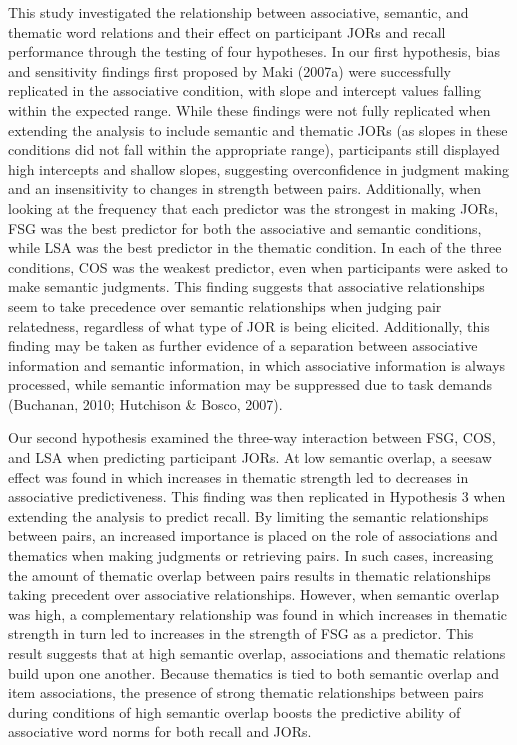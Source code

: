 \documentclass[english,man]{apa6}
\theoremstyle{definition}
\theoremstyle{definition}
\theoremstyle{definition}
\theoremstyle{remark}
\begin{document}
This study investigated the relationship between associative, semantic,
and thematic word relations and their effect on participant JORs and
recall performance through the testing of four hypotheses. In our first
hypothesis, bias and sensitivity findings first proposed by Maki (2007a)
were successfully replicated in the associative condition, with slope
and intercept values falling within the expected range. While these
findings were not fully replicated when extending the analysis to
include semantic and thematic JORs (as slopes in these conditions did
not fall within the appropriate range), participants still displayed
high intercepts and shallow slopes, suggesting overconfidence in
judgment making and an insensitivity to changes in strength between
pairs. Additionally, when looking at the frequency that each predictor
was the strongest in making JORs, FSG was the best predictor for both
the associative and semantic conditions, while LSA was the best
predictor in the thematic condition. In each of the three conditions,
COS was the weakest predictor, even when participants were asked to make
semantic judgments. This finding suggests that associative relationships
seem to take precedence over semantic relationships when judging pair
relatedness, regardless of what type of JOR is being elicited.
Additionally, this finding may be taken as further evidence of a
separation between associative information and semantic information, in
which associative information is always processed, while semantic
information may be suppressed due to task demands (Buchanan, 2010;
Hutchison \& Bosco, 2007).

Our second hypothesis examined the three-way interaction between FSG,
COS, and LSA when predicting participant JORs. At low semantic overlap,
a seesaw effect was found in which increases in thematic strength led to
decreases in associative predictiveness. This finding was then
replicated in Hypothesis 3 when extending the analysis to predict
recall. By limiting the semantic relationships between pairs, an
increased importance is placed on the role of associations and thematics
when making judgments or retrieving pairs. In such cases, increasing the
amount of thematic overlap between pairs results in thematic
relationships taking precedent over associative relationships. However,
when semantic overlap was high, a complementary relationship was found
in which increases in thematic strength in turn led to increases in the
strength of FSG as a predictor. This result suggests that at high
semantic overlap, associations and thematic relations build upon one
another. Because thematics is tied to both semantic overlap and item
associations, the presence of strong thematic relationships between
pairs during conditions of high semantic overlap boosts the predictive
ability of associative word norms for both recall and JORs.
\end{document}
